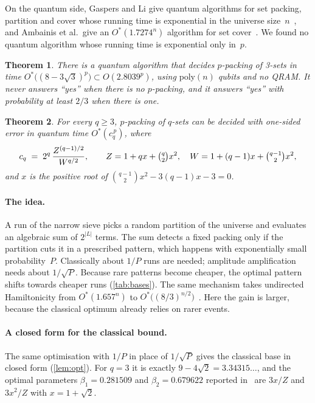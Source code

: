 \documentclass[11pt,a4paper]{article}
\theoremstyle{plain}
\newtheorem{theorem}{Theorem}
\newtheorem{corollary}[theorem]{Corollary}
\theoremstyle{remark}
\newcommand{\Ostar}{O^{*}}
\begin{document}
On the quantum side, Gaspers and Li give quantum algorithms for set packing, partition and cover whose running time is exponential in the universe size~$n$~\cite{gaspersli}, and Ambainis et al.\ give an $\Ostar(1.7274^n)$ algorithm for set cover~\cite{ambainis}. We found no quantum algorithm whose running time is exponential only in~$p$.

\begin{mainresult}
\begin{theorem}\label{thm:main}
There is a quantum algorithm that decides $p$-packing of 3-sets in time $\Ostar\big((8-3\sqrt3)^p\big) \subset O(2.8039^p)$, using $\mathrm{poly}(n)$ qubits and no QRAM. It never answers ``yes'' when there is no $p$-packing, and it answers ``yes'' with probability at least $2/3$ when there is one.
\end{theorem}
\begin{theorem}\label{thm:general}
For every $q \ge 3$, $p$-packing of $q$-sets can be decided with one-sided error in quantum time $\Ostar(c_q^{\,p})$, where
\[
  c_q \;=\; 2^q\,\frac{Z^{(q-1)/2}}{W^{q/2}},\qquad
  Z = 1 + qx + \tbinom q2 x^2,\quad
  W = 1 + (q-1)x + \tbinom{q-1}2 x^2,
\]
and $x$ is the positive root of $\binom{q-1}{2}x^2 - 3(q-1)x - 3 = 0$.
\end{theorem}
\end{mainresult}

\paragraph{The idea.}
A run of the narrow sieve picks a random partition of the universe and evaluates an algebraic sum of $2^{|L|}$ terms. The sum detects a fixed packing only if the partition cuts it in a prescribed pattern, which happens with exponentially small probability~$P$. Classically about $1/P$ runs are needed; amplitude amplification needs about $1/\sqrt P$. Because rare patterns become cheaper, the optimal pattern shifts towards cheaper runs (\cref{tab:bases}). The same mechanism takes undirected Hamiltonicity from $\Ostar(1.657^n)$ to $\Ostar\big((8/3)^{n/2}\big)$~\cite{hamilton}. Here the gain is larger, because the classical optimum already relies on rarer events.

\paragraph{A closed form for the classical bound.}
The same optimisation with $1/P$ in place of $1/\sqrt P$ gives the classical base in closed form (\cref{lem:opt}). For $q = 3$ it is exactly $9 - 4\sqrt2 = 3.34315\ldots$, and the optimal parameters $\beta_1 = 0.281509$ and $\beta_2 = 0.679622$ reported in~\cite[\S 4.7]{bhkk} are $3x/Z$ and $3x^2/Z$ with $x = 1+\sqrt2$.
\end{document}
